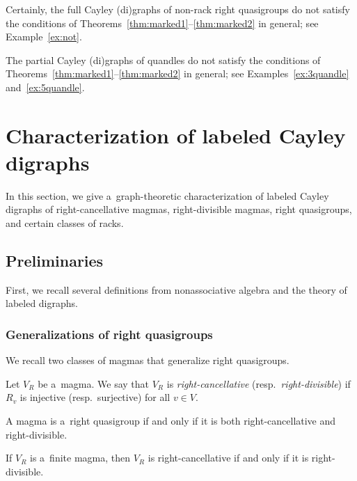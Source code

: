 \documentclass{jonasart}
\begin{document}
	\begin{remark}
		Certainly, the full Cayley (di)graphs of non-rack right quasigroups do not satisfy the conditions of Theorems~\ref{thm:marked1}--\ref{thm:marked2} in general; see Example~\ref{ex:not}.
	\end{remark}

	\begin{remark}
		The partial Cayley (di)graphs of quandles do not satisfy the conditions of Theorems~\ref{thm:marked1}--\ref{thm:marked2} in general; see Examples~\ref{ex:3quandle} and~\ref{ex:5quandle}.
	\end{remark}
    
	\section{Characterization of labeled Cayley digraphs}\label{sec:5}
	
    In this section, we give a~graph-theoretic characterization of labeled Cayley digraphs of right-cancellative magmas, right-divisible magmas, right quasigroups, and certain classes of racks.

	\subsection{Preliminaries} First, we recall several definitions from nonassociative algebra and the theory of labeled digraphs.

	\subsubsection{Generalizations of right quasigroups}
	We recall two classes of magmas that generalize right quasigroups.

	\begin{definition}
		Let $V_R$ be a~magma. We say that $V_R$ is \emph{right-cancellative} (resp.\ \emph{right-divisible}) if $R_v$ is injective (resp.\ surjective) for all $v\in V$.
	\end{definition}

	\begin{remark}\label{obs:both}
		A magma is a~right quasigroup if and only if it is both right-cancellative and right-divisible.
	\end{remark}

	\begin{remark}
		If $V_R$ is a~finite magma, then $V_R$ is right-cancellative if and only if it is right-divisible.
	\end{remark}
\end{document}
